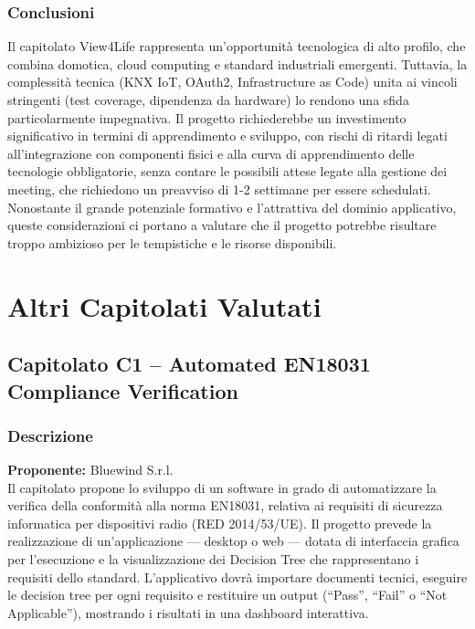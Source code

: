 \documentclass{article}
\begin{document}
	\subsubsection{Conclusioni}
	Il capitolato View4Life rappresenta un'opportunità tecnologica di alto profilo, che combina domotica, cloud computing e standard industriali emergenti. Tuttavia, la complessità tecnica (KNX IoT, OAuth2, Infrastructure as Code) unita ai vincoli stringenti (test coverage, dipendenza da hardware) lo rendono una sfida particolarmente impegnativa.
    Il progetto richiederebbe un investimento significativo in termini di apprendimento e sviluppo, con rischi di ritardi legati all'integrazione con componenti fisici e alla curva di apprendimento delle tecnologie obbligatorie, senza contare le possibili attese legate alla gestione dei meeting, che richiedono un preavviso di 1-2 settimane per essere schedulati. 
    Nonostante il grande potenziale formativo e l'attrattiva del dominio applicativo, queste considerazioni ci portano a valutare che il progetto potrebbe risultare troppo ambizioso per le tempistiche e le risorse disponibili.


	
	\section{Altri Capitolati Valutati}
	\subsection{Capitolato C1 – Automated EN18031 Compliance Verification}
	\subsubsection{Descrizione}
    \textbf{Proponente:} Bluewind S.r.l.\\
	Il capitolato propone lo sviluppo di un software in grado di automatizzare la verifica della conformità alla norma EN18031, relativa ai requisiti di sicurezza informatica per dispositivi radio (RED 2014/53/UE).
    Il progetto prevede la realizzazione di un’applicazione — desktop o web — dotata di interfaccia grafica per l’esecuzione e la visualizzazione dei Decision Tree che rappresentano i requisiti dello standard.
    L’applicativo dovrà importare documenti tecnici, eseguire le decision tree per ogni requisito e restituire un output (“Pass”, “Fail” o “Not Applicable”), mostrando i risultati in una dashboard interattiva.

	
\end{document}
